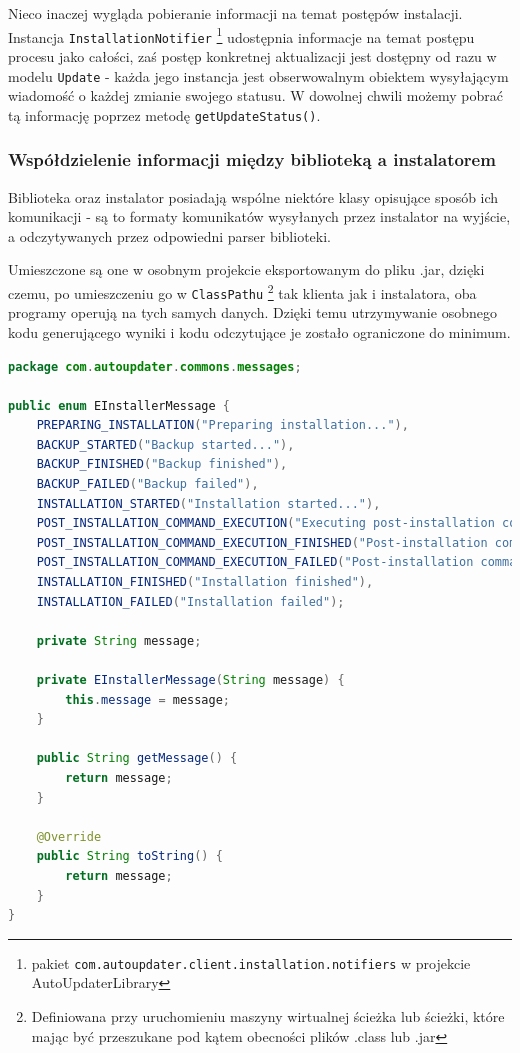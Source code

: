 \documentclass[polish,12pt,titlepage]{article}
\begin{document}
Nieco inaczej wygląda pobieranie informacji na temat postępów instalacji.
Instancja \texttt{InstallationNotifier} \footnote{pakiet
\texttt{com.autoupdater.client.installation.notifiers} w projekcie
AutoUpdaterLibrary} udostępnia informacje na temat postępu procesu jako
całości, zaś postęp konkretnej aktualizacji jest dostępny od razu w modelu
\texttt{Update} - każda jego instancja jest obserwowalnym obiektem wysyłającym
wiadomość o każdej zmianie swojego statusu. W dowolnej chwili możemy pobrać tą
informację poprzez metodę \texttt{getUpdateStatus()}.

\subsubsection{Współdzielenie informacji między biblioteką a instalatorem}

Biblioteka oraz instalator posiadają wspólne niektóre klasy opisujące
sposób ich komunikacji - są to formaty komunikatów wysyłanych przez instalator
na wyjście, a odczytywanych przez odpowiedni parser biblioteki.

Umieszczone są one w osobnym projekcie eksportowanym do pliku .jar, dzięki
czemu, po umieszczeniu go w \texttt{ClassPathu} \footnote{Definiowana przy
uruchomieniu maszyny wirtualnej ścieżka lub ścieżki, które mając być
przeszukane pod kątem obecności plików .class lub .jar} tak klienta jak i
instalatora, oba programy operują na tych samych danych. Dzięki temu
utrzymywanie osobnego kodu generującego wyniki i kodu odczytujące je zostało
ograniczone do minimum.

\begin{lstlisting}[language=Java, frame=lines, numberstyle=\tiny,
stepnumber=5, caption=Typ wyliczeniowy opisujący etap instalacji., firstnumber=1]
package com.autoupdater.commons.messages;

public enum EInstallerMessage {
    PREPARING_INSTALLATION("Preparing installation..."),
    BACKUP_STARTED("Backup started..."),
    BACKUP_FINISHED("Backup finished"),
    BACKUP_FAILED("Backup failed"),
    INSTALLATION_STARTED("Installation started..."),
    POST_INSTALLATION_COMMAND_EXECUTION("Executing post-installation commands..."),
    POST_INSTALLATION_COMMAND_EXECUTION_FINISHED("Post-installation command execution failed"),
    POST_INSTALLATION_COMMAND_EXECUTION_FAILED("Post-installation command execution failed"),
    INSTALLATION_FINISHED("Installation finished"),
    INSTALLATION_FAILED("Installation failed");

    private String message;

    private EInstallerMessage(String message) {
        this.message = message;
    }

    public String getMessage() {
        return message;
    }

    @Override
    public String toString() {
        return message;
    }
}
\end{lstlisting}
\end{document}
